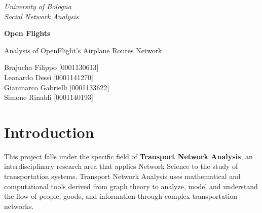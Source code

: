 \documentclass[12pt]{article}
\begin{document}
\begin{titlepage}

\begin{center}
    { \textit{University of Bologna} }\\
    \vspace{5mm}
    { \textit{Social Network Analysis} }\\
\end{center}

\vspace{20mm}

\begin{center}
    {\LARGE{\bf Open Flights}}\\
\end{center}

\vspace{20mm}

\begin{center}
    {\LARGE{Analysis of OpenFlight's Airplane Routes Network}}\\
\end{center}

\vspace{30mm}

\begin{center}
    {\large{Brajucha Filippo [0001130613]\\}}
    \vspace{5mm}
    {\large{Leonardo Dessì [0001141270] \\}}
    \vspace{5mm}
    {\large{Gianmarco Gabrielli [0001133622]  \\}}
    \vspace{5mm}
    {\large{Simone Rinaldi [0001140193]\\}}
\end{center}

\vspace{40mm}

\end{titlepage}

\tableofcontents
\newpage
\section{Introduction}
This project falls under the specific field of \textbf{Transport Network Analysis}, an interdisciplinary research area that applies Network Science to the study of transportation systems. Transport Network Analysis uses mathematical and computational tools derived from graph theory to analyze, model and understand the flow of people, goods, and information through complex transportation networks.
\end{document}
